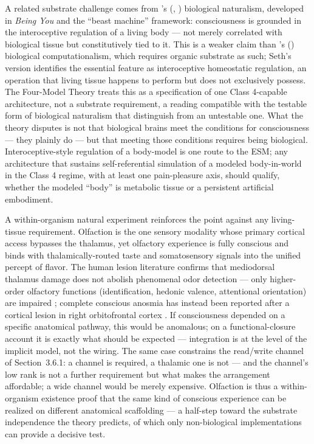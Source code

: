 \documentclass[12pt]{article}
\newcommand{\revstart}{}
\newcommand{\revend}{}
\begin{document}
{\revstart A related substrate challenge comes from \citeauthor{Seth2021}'s (\citeyear{Seth2021}, \citeyear{Seth2025}) biological naturalism, developed in \emph{Being You} and the ``beast machine'' framework: consciousness is grounded in the interoceptive regulation of a living body --- not merely correlated with biological tissue but constitutively tied to it. This is a weaker claim than \citeauthor{Milinkovic2025}'s (\citeyear{Milinkovic2025}) biological computationalism, which requires organic substrate as such; Seth's version identifies the essential feature as interoceptive homeostatic regulation, an operation that living tissue happens to perform but does not exclusively possess. The Four-Model Theory treats this as a specification of one Class 4-capable architecture, not a substrate requirement, a reading compatible with the testable form of biological naturalism that \citet{KlatzmannDoerig2026} distinguish from an untestable one. What the theory disputes is not that biological brains meet the conditions for consciousness --- they plainly do --- but that meeting those conditions requires being biological. Interoceptive-style regulation of a body-model is one route to the ESM; any architecture that sustains self-referential simulation of a modeled body-in-world in the Class 4 regime, with at least one pain-pleasure axis, should qualify, whether the modeled ``body'' is metabolic tissue or a persistent artificial embodiment.\revend}

{\revstart A within-organism natural experiment reinforces the point against any living-tissue requirement. Olfaction is the one sensory modality whose primary cortical access bypasses the thalamus, yet olfactory experience is fully conscious and binds with thalamically-routed taste and somatosensory signals into the unified percept of flavor. The human lesion literature confirms that mediodorsal thalamus damage does not abolish phenomenal odor detection --- only higher-order olfactory functions (identification, hedonic valence, attentional orientation) are impaired \citep{Sela2009,CourtiolWilson2015}; complete conscious anosmia has instead been reported after a cortical lesion in right orbitofrontal cortex \citep[single-case evidence:][]{Li2010}. If consciousness depended on a specific anatomical pathway, this would be anomalous; on a functional-closure account it is exactly what should be expected --- integration is at the level of the implicit model, not the wiring. The same case constrains the read/write channel of Section~3.6.1: a channel is required, a thalamic one is not --- and the channel's low rank is not a further requirement but what makes the arrangement affordable; a wide channel would be merely expensive. Olfaction is thus a within-organism existence proof that the same kind of conscious experience can be realized on different anatomical scaffolding --- a half-step toward the substrate independence the theory predicts, of which only non-biological implementations can provide a decisive test.\revend}
\end{document}

